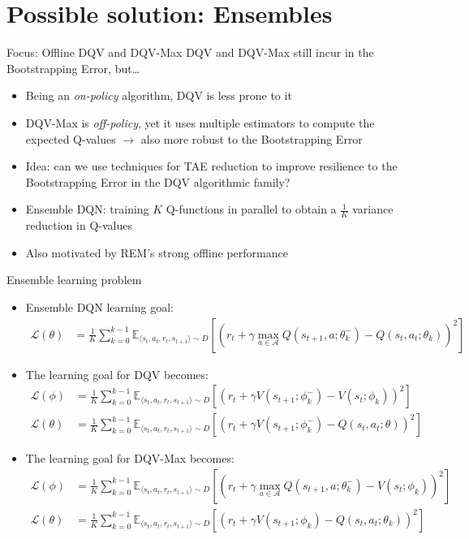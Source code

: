 \documentclass[presentation]{beamer}
\begin{document}
\section{Possible solution: Ensembles}
\label{sec:orgf6efc56}
\begin{frame}[label={sec:org2bfc36e}]{Focus: Offline DQV and DQV-Max}
DQV and DQV-Max still incur in the Bootstrapping Error, but\ldots{}
\begin{itemize}
\item Being an \emph{on-policy} algorithm, DQV is less prone to it
\item DQV-Max is \emph{off-policy}, yet it uses multiple estimators to compute
the expected Q-values \(\rightarrow\) also more robust to the
Bootstrapping Error
\item \alert{Idea}: can we use techniques for TAE reduction to improve resilience
to the Bootstrapping Error in the DQV algorithmic family?
\item Ensemble DQN\cite{anschel2017averaged}: training \(K\) Q-functions in
parallel to obtain a \(\frac{1}{K}\) variance reduction in Q-values
\item Also motivated by REM's strong offline performance
\end{itemize}
\end{frame}
\begin{frame}[label={sec:org692df91}]{Ensemble learning problem}
\fontsize{9pt}{10pt}\selectfont
\begin{itemize}
\item Ensemble DQN learning goal:
\begin{align}
\mathcal{L}(\theta) &= \frac{1}{K}\sum_{k=0}^{k-1}\mathbb{E}_{\langle s_t, a_t, r_t, s_{t+1} \rangle \sim D}\left[(r_t + \gamma \max_{a\in\mathcal{A}}Q(s_{t+1},a;\theta_{k}^{-}) - Q(s_t, a_t;\theta_{k}))^2\right]
\end{align}
\item The learning goal for DQV becomes:
\begin{align}
\mathcal{L}(\phi) &= \frac{1}{K}\sum_{k=0}^{k-1}\mathbb{E}_{\langle s_t, a_t, r_t, s_{t+1} \rangle \sim D}\left[(r_t + \gamma V(s_{t+1};\phi_{k}^{-}) - V(s_t;\phi_{k}))^2\right] \\
\mathcal{L}(\theta) &= \frac{1}{K}\sum_{k=0}^{k-1}\mathbb{E}_{\langle s_t, a_t, r_t, s_{t+1} \rangle \sim D}\left[(r_t + \gamma V(s_{t+1};\phi_{k}^{-}) - Q(s_t, a_t;\theta))^2\right]
\end{align}
\item The learning goal for DQV-Max becomes:
\begin{align}
\label{eq:org093b6f2}
\mathcal{L}(\phi) &= \frac{1}{K}\sum_{k=0}^{k-1}\mathbb{E}_{\langle s_t, a_t, r_t, s_{t+1} \rangle \sim D}\left[(r_t + \gamma \max_{a\in\mathcal{A}}Q(s_{t+1},a;\theta_{k}^{-}) - V(s_t;\phi_{k}))^2\right] \\
\mathcal{L}(\theta) &= \frac{1}{K}\sum_{k=0}^{k-1}\mathbb{E}_{\langle s_t, a_t, r_t, s_{t+1} \rangle \sim D}\left[(r_t + \gamma V(s_{t+1};\phi_{k}) - Q(s_t, a_t;\theta_{k}))^2\right]
\end{align}
\end{itemize}
\end{frame}
\end{document}
